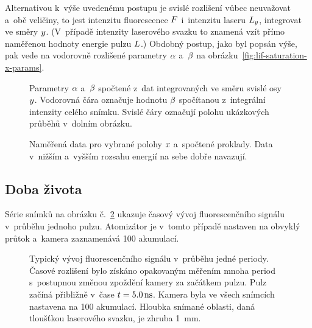 Alternativou k~výše uvedenému postupu je svislé rozlišení vůbec neuvažovat
a~obě veličiny, to jest intenzitu fluorescence $F$ i~intenzitu
laseru $L_y$, integrovat ve směry $y$.
(V~případě intenzity laserového svazku to znamená vzít přímo
naměřenou hodnoty energie pulzu $L$.)
Obdobný postup, jako byl popsán výše, pak vede na vodorovně rozlišené
parametry $\alpha$ a~$\beta$ na obrázku~\ref{fig:lif-saturation-x-params}.

\begin{figure}[htp]
	\centering
	\small
	
	\caption{Parametry $\alpha$ a~$\beta$ spočtené z~dat integrovaných
		ve směru svislé osy $y$.
		Vodorovná čára označuje hodnotu $\beta$ spočítanou z~integrální
		intenzity celého snímku.
		Svislé čáry označují polohu ukázkových průběhů v~dolním obrázku.}
	\label{fig:lif-saturation-x-params}
	
	\caption{Naměřená data pro vybrané polohy $x$ a~spočtené proklady.
		Data v~nižším a~vyšším rozsahu energií na sebe dobře navazují.}
	\label{fig:lif-saturation-x-fits}
\end{figure}

\subsection{Doba života}
\label{sec:lif-lifetime}

Série snímků na obrázku č.~\ref{fig:lif-timeev} ukazuje časový vývoj
fluorescenčního signálu v~průběhu jednoho pulzu.
Atomizátor je v~tomto případě nastaven na obvyklý průtok
a~kamera zaznamenává 100 akumulací.

\begin{figure}[p]
	\centering
	
	\caption{Typický vývoj fluorescenčního signálu v~průběhu jedné periody.
		Časové rozlišení bylo získáno opakovaným měřením mnoha period
		s~postupnou změnou zpoždění kamery za začátkem pulzu.
		Pulz začíná přibližně v~čase $t = \SI{5.0}{\nano\second}$.
		Kamera byla ve všech snímcích nastavena na \num{100} akumulací.
		Hloubka snímané oblasti, daná tloušťkou laserového svazku,
		je zhruba \SI{1}{\milli\metre}.}
	\label{fig:lif-timeev}
\end{figure}

